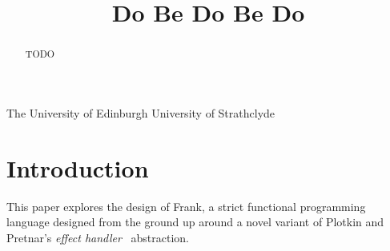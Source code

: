 \documentclass[preprint]{sigplanconf}
\begin{document}


\title{Do Be Do Be Do}

           {The University of Edinburgh}
           {}
           {University of Strathclyde}
           {}

\maketitle



\begin{abstract}
TODO
\end{abstract}


\section{Introduction}


This paper explores the design of Frank, a strict functional
programming language designed from the ground up around a novel
variant of Plotkin and Pretnar's \emph{effect
  handler}~\cite{PlotkinP09, PlotkinP13} abstraction.
\end{document}
